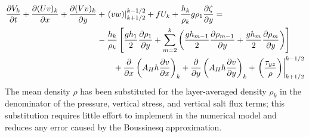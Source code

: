 \begin{align}
 \frac{\partial V_k}{\partial t}+\frac{\partial(U v)_k}{\partial x}+\frac{\partial(V v)_k}{\partial y}&+\left.(v w)\right|_{k+1 / 2} ^{k-1 / 2}+f U_k+\frac{h_k}{\rho_k} g \rho_1 \frac{\partial \zeta}{\partial y}=  \notag\\
&-\frac{h_k}{\rho_k}\left[\frac{g h_1}{2} \frac{\partial \rho_1}{\partial y}+\sum_{m=2}^k\left(\frac{g h_{m-1}}{2} \frac{\partial \rho_{m-1}}{\partial y}+\frac{g h_m}{2} \frac{\partial \rho_m}{\partial y}\right)\right]\notag\\
&\qquad+\frac{\partial}{\partial x}\left(A_H h \frac{\partial v}{\partial x}\right)_k+\frac{\partial}{\partial y}\left(A_H h \frac{\partial v}{\partial y}\right)_k+\left.\left(\frac{\tau_{y z}}{\rho}\right)\right|_{k+1 / 2} ^{k-1 / 2}
\end{align}
The mean density $\rho$ has been substituted for the layer-averaged density $\rho_k$  in the denominator of the pressure, vertical stress, and vertical salt flux terms; this substitution requires little effort to implement in the numerical model and reduces any error caused by the Boussinesq approximation.